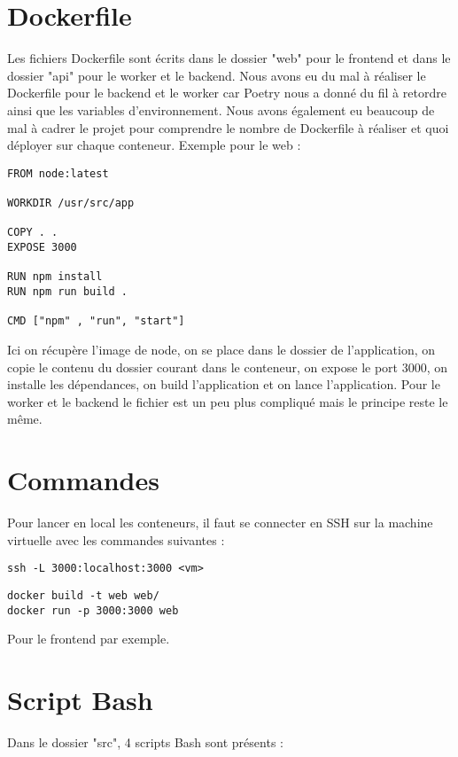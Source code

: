 \documentclass{report}
\begin{document}
\newpage

\chapter{Dockerfile}
Les fichiers Dockerfile sont écrits dans le dossier "web" pour le frontend et dans le dossier "api" pour le worker et le backend. Nous avons eu du mal à réaliser le Dockerfile pour le backend et le worker car Poetry nous a donné du fil à retordre ainsi que les variables d'environnement. Nous avons également eu beaucoup de mal à cadrer le projet pour comprendre le nombre de Dockerfile à réaliser et quoi déployer sur chaque conteneur.
Exemple pour le web :
\begin{verbatim}
FROM node:latest    

WORKDIR /usr/src/app

COPY . .
EXPOSE 3000

RUN npm install 
RUN npm run build . 

CMD ["npm" , "run", "start"]
\end{verbatim}
Ici on récupère l'image de node, on se place dans le dossier de l'application, on copie le contenu du dossier courant dans le conteneur, on expose le port 3000, on installe les dépendances, on build l'application et on lance l'application.
Pour le worker et le backend le fichier est un peu plus compliqué mais le principe reste le même.
\newpage

\chapter{Commandes}
Pour lancer en local les conteneurs, il faut se connecter en SSH sur la machine virtuelle avec les commandes suivantes :

\begin{verbatim}
ssh -L 3000:localhost:3000 <vm>
\end{verbatim}

\begin{verbatim}
docker build -t web web/
docker run -p 3000:3000 web
\end{verbatim}

Pour le frontend par exemple.

\newpage

\chapter{Script Bash}
Dans le dossier "src", 4 scripts Bash sont présents :
\end{document}
